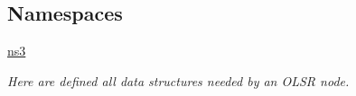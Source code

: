 \subsection*{Namespaces}
\begin{DoxyCompactItemize}
\item 
 \hyperlink{namespacens3}{ns3}
\begin{DoxyCompactList}\small\item\em Here are defined all data structures needed by an O\+L\+SR node. \end{DoxyCompactList}\end{DoxyCompactItemize}
